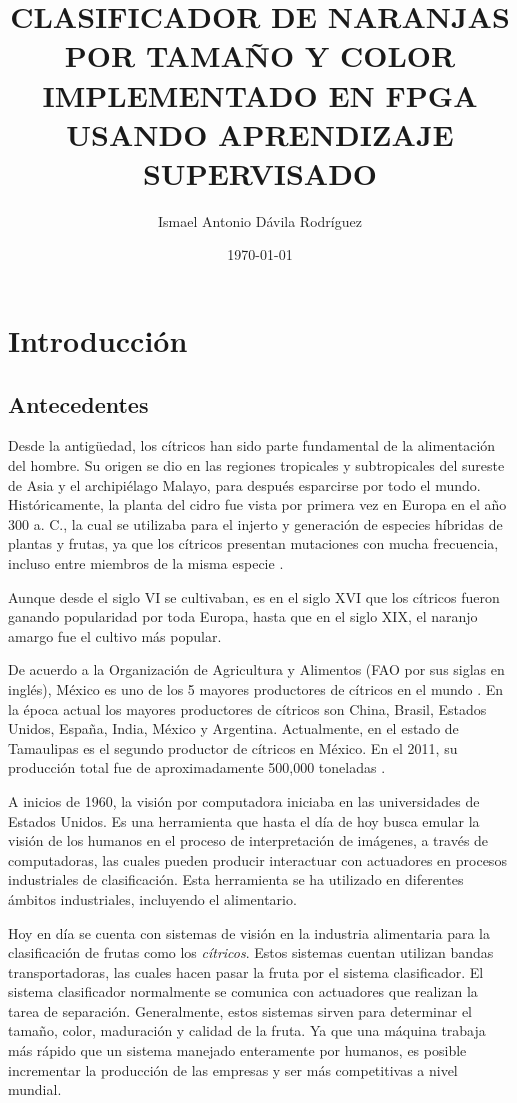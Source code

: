 \documentclass[twoside,spanish,ESP,MSc]{plantillaLabUPV}
\title	{CLASIFICADOR DE NARANJAS POR TAMAÑO  Y COLOR IMPLEMENTADO EN FPGA USANDO APRENDIZAJE SUPERVISADO}
\author      	{Ismael Antonio Dávila Rodríguez}
\date           	{\today}
\theoremstyle{definition}
\begin{document}
\makeintropages



\chapter{Introducción} \label{chap:intro}

\section{Antecedentes}

Desde la antigüedad, los cítricos han sido parte fundamental de la alimentación del hombre. Su origen se dio en las regiones tropicales y subtropicales del sureste de Asia y el archipiélago Malayo, para después esparcirse por todo el mundo. Históricamente, la planta del cidro fue vista por primera vez en Europa en el año 300 a. C., la cual se utilizaba para el injerto y generación de especies híbridas de plantas y frutas, ya que los cítricos presentan mutaciones con mucha frecuencia, incluso entre miembros de la misma especie \cite{anticidi}.

Aunque desde el siglo VI se cultivaban, es en el siglo XVI que los cítricos fueron ganando popularidad por toda Europa, hasta que en el siglo XIX, el naranjo amargo fue el cultivo más popular.

De acuerdo a la Organización de Agricultura y Alimentos (FAO por sus siglas en inglés), México es uno de los 5 mayores productores de cítricos en el mundo \cite{FAO_2016}. En la época actual los mayores productores de cítricos son China, Brasil, Estados Unidos, España, India, México y Argentina. Actualmente, en el estado de Tamaulipas es el segundo productor de cítricos en México. En el 2011, su producción total fue de aproximadamente 500,000 toneladas \cite{sag}.


A inicios de 1960, la visión por computadora iniciaba en las universidades de Estados Unidos. Es una herramienta que hasta el día de hoy busca emular la visión de los humanos en el proceso de interpretación de imágenes, a través de computadoras, las cuales pueden producir interactuar con actuadores en procesos industriales de clasificación. Esta herramienta se ha utilizado en diferentes ámbitos industriales, incluyendo el alimentario.

Hoy en día se cuenta con sistemas de visión en la industria alimentaria para la clasificación de frutas como los \textit{cítricos}. Estos sistemas cuentan utilizan bandas transportadoras, las cuales hacen pasar la fruta por el sistema clasificador. El sistema clasificador normalmente se comunica con actuadores que realizan la tarea de separación. Generalmente, estos sistemas sirven para determinar el tamaño, color, maduración y calidad de la fruta. Ya que una máquina trabaja más rápido que un sistema manejado enteramente por humanos, es posible incrementar la producción de las empresas y ser más competitivas a nivel mundial. 
\end{document}
